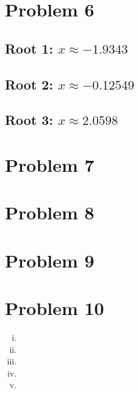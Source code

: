 \documentclass[11pt]{article} %
\begin{document}
\section*{Problem 6}
\subsection*{Root 1: $x  \approx -1.9343$ }
\subsection*{Root 2: $x \approx -0.12549$}
\subsection*{Root 3: $x \approx 2.0598$}

\section*{Problem 7}

\section*{Problem 8}

\section*{Problem 9}

\section*{Problem 10}
\begin{enumerate}[i.)]
\item
\item
\item
\item
\item
\end{enumerate}
\end{document}
